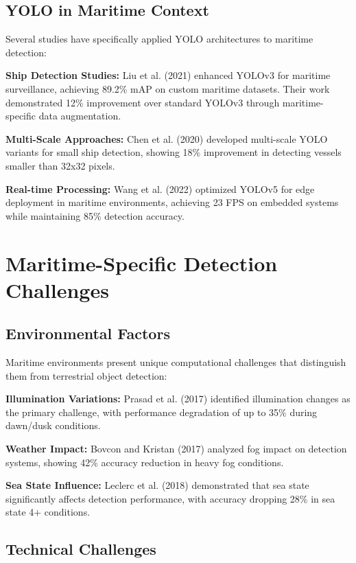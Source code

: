 \documentclass[12pt,a4paper]{report}
\begin{document}
\subsection{YOLO in Maritime Context}
Several studies have specifically applied YOLO architectures to maritime detection:

\textbf{Ship Detection Studies:} Liu et al. (2021) \cite{liu2021enhanced} enhanced YOLOv3 for maritime surveillance, achieving 89.2\% mAP on custom maritime datasets. Their work demonstrated 12\% improvement over standard YOLOv3 through maritime-specific data augmentation.

\textbf{Multi-Scale Approaches:} Chen et al. (2020) \cite{chen2020improved} developed multi-scale YOLO variants for small ship detection, showing 18\% improvement in detecting vessels smaller than 32x32 pixels.

\textbf{Real-time Processing:} Wang et al. (2022) \cite{wang2022realtime} optimized YOLOv5 for edge deployment in maritime environments, achieving 23 FPS on embedded systems while maintaining 85\% detection accuracy.

\section{Maritime-Specific Detection Challenges}

\subsection{Environmental Factors}
Maritime environments present unique computational challenges that distinguish them from terrestrial object detection:

\textbf{Illumination Variations:} Prasad et al. (2017) \cite{prasad2017video} identified illumination changes as the primary challenge, with performance degradation of up to 35\% during dawn/dusk conditions.

\textbf{Weather Impact:} Bovcon and Kristan (2017) \cite{bovcon2017segmentation} analyzed fog impact on detection systems, showing 42\% accuracy reduction in heavy fog conditions.

\textbf{Sea State Influence:} Leclerc et al. (2018) \cite{leclerc2018impact} demonstrated that sea state significantly affects detection performance, with accuracy dropping 28\% in sea state 4+ conditions.

\subsection{Technical Challenges}
\end{document}
